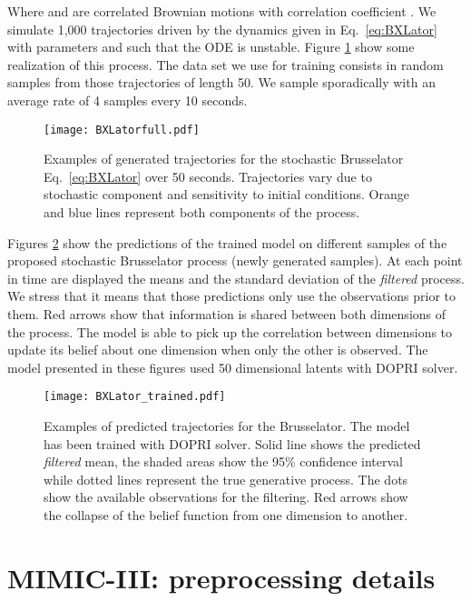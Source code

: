 \documentclass{article}
\begin{document}
Where  and  are correlated Brownian motions with correlation coefficient . We simulate 1,000 trajectories driven by the dynamics given in Eq.~\ref{eq:BXLator} with parameters  and  such that the ODE is unstable. Figure \ref{fig:BXLator_examples} show some realization of this process. The data set we use for training consists in random samples from those trajectories of length 50. We sample sporadically with an average rate of 4 samples every 10 seconds.

\begin{figure}[hbt]
\centering
\centerline{\texttt{[image: BXLatorfull.pdf]}}
\caption{ Examples of generated trajectories for the stochastic Brusselator Eq.~\ref{eq:BXLator} over 50 seconds. Trajectories vary due to stochastic component and sensitivity to initial conditions. Orange and blue lines represent both components of the process.
}
\label{fig:BXLator_examples}
\end{figure}

Figures \ref{fig:BXLator_trained} show the predictions of the trained model on different samples of the proposed stochastic Brusselator process (newly generated samples). At each point in time are displayed the means and the standard deviation of the \emph{filtered} process. We stress that it means that those predictions only use the observations prior to them. Red arrows show that information is shared between both dimensions of the process. The model is able to pick up the correlation between dimensions to update its belief about one dimension when only the other is observed. The model presented in these figures used 50 dimensional latents with DOPRI solver.

\begin{figure}[hbt]
\centering
\centerline{\texttt{[image: BXLator\_trained.pdf]}}
\caption{ Examples of predicted trajectories for the Brusselator. The model has been trained with DOPRI solver. Solid line shows the predicted \emph{filtered} mean, the shaded areas show the 95\% confidence interval while dotted lines represent the true generative process. The dots show the available observations for the filtering. Red arrows show the collapse of the belief function from one dimension to another.
}
\label{fig:BXLator_trained}
\end{figure}

\section{MIMIC-III: preprocessing details}
\label{app:mimic3}
\end{document}
